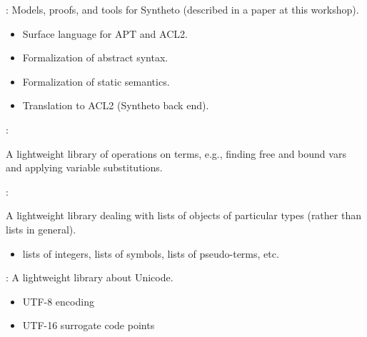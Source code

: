 
\begin{frame}

\newlibtitle

:
Models, proofs, and tools for Syntheto (described in a paper at this workshop).
\begin{itemize}
\item Surface language for APT and ACL2.
\item Formalization of abstract syntax.
\item Formalization of static semantics.
\item Translation to ACL2 (Syntheto back end).
\end{itemize}

\end{frame}


\begin{frame}

\newlibtitle

:

A lightweight library of operations on terms, e.g., finding free and
bound vars and applying variable substitutions.

\end{frame}


\begin{frame}

\newlibtitle

:

A lightweight library dealing with lists of objects of particular
types (rather than lists in general).

\begin{itemize}
\item lists of integers, lists of symbols, lists of pseudo-terms, etc.
\end{itemize}
\end{frame}


\begin{frame}

\newlibtitle

:
A lightweight library about Unicode.
\begin{itemize}
\item UTF-8 encoding
\item UTF-16 surrogate code points
\end{itemize}
\end{frame}

